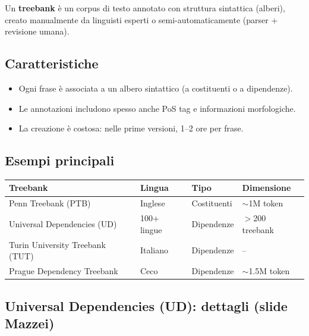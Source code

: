 \documentclass[12pt,a4paper]{article}
\begin{document}
Un \textbf{treebank} è un corpus di testo annotato con struttura sintattica (alberi), creato manualmente da linguisti esperti o semi-automaticamente (parser + revisione umana).

\subsection{Caratteristiche}

\begin{itemize}[leftmargin=1.5em]
  \item Ogni frase è associata a un albero sintattico (a costituenti o a dipendenze).
  \item Le annotazioni includono spesso anche PoS tag e informazioni morfologiche.
  \item La creazione è costosa: nelle prime versioni, 1--2 ore per frase.
\end{itemize}

\subsection{Esempi principali}

\begin{center}
\begin{tabular}{llll}
\toprule
\textbf{Treebank} & \textbf{Lingua} & \textbf{Tipo} & \textbf{Dimensione} \\
\midrule
Penn Treebank (PTB) & Inglese & Costituenti & $\sim$1M token \\
Universal Dependencies (UD) & 100+ lingue & Dipendenze & $>$200 treebank \\
Turin University Treebank (TUT) & Italiano & Dipendenze & -- \\
Prague Dependency Treebank & Ceco & Dipendenze & $\sim$1.5M token \\
\bottomrule
\end{tabular}
\end{center}

\subsection{Universal Dependencies (UD): dettagli (slide Mazzei)}
\end{document}
